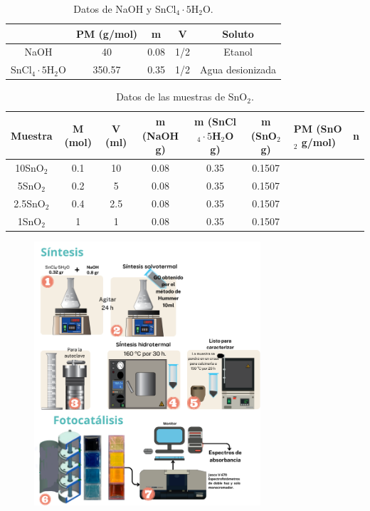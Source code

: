 \documentclass[12pt]{article}
\begin{document}
    \begin{table}[h]
    \caption{Datos de NaOH y SnCl$_{4} \cdot 5$H$_{2}$O.}
    \centering
    \begin{tabular}{|c|c|c|c|c|}
    \hline
     & PM (g/mol) & m & V & Soluto\\
    \hline
    NaOH & 40 & 0.08 & 1/2 & Etanol\\
    \hline
    SnCl$_{4} \cdot 5$H$_{2}$O & 350.57 & 0.35 & 1/2 & Agua desionizada\\
    \hline
    \end{tabular}
    \label{tab:tabla_naoh_sncl4}
    \end{table}
    
    \begin{table}[h]
    \caption{Datos de las muestras de SnO$_{2}$.}
    \centering
    \begin{tabular}{|c|c|c|c|c|c|}
    \hline
    Muestra & M (mol) & V (ml) & m (NaOH g) & m (SnCl$_{4} \cdot 5$H$_{2}$O g) & m (SnO$_{2}$ g) & PM (SnO$_{2}$ g/mol) & n\\
    \hline
    10SnO$_{2}$ & 0.1 & 10 & 0.08 & 0.35 & 0.1507\\
    \hline
    5SnO$_{2}$ & 0.2 & 5 & 0.08 & 0.35 & 0.1507\\
    \hline
    2.5SnO$_{2}$ & 0.4 & 2.5 & 0.08 & 0.35 & 0.1507\\
    \hline
    1SnO$_{2}$ & 1 & 1 & 0.08 & 0.35 & 0.1507\\
    \hline
    \end{tabular}
    \label{tab:tabla_muestras_sno2_GO}
    \end{table}
    
             \begin{figure}[H]
            	\begin{center}
             		\includegraphics[width = 0.75\textwidth]{Imagenes/CARTEL.png}
            	\end{center} 
            \end{figure}        
    
\end{document}

